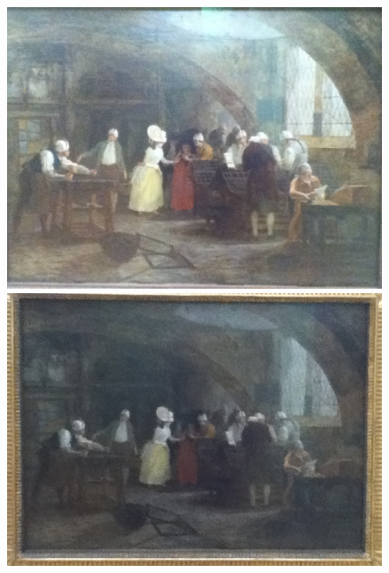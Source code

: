 \begin{figure}
  \centering
  \begin{minipage}[c]{.33\linewidth}
    \centering
    \includegraphics[width=\textwidth]{figures/11J-0521.JPG}
  \end{minipage} \hfill
  \begin{minipage}[c]{.33\linewidth}
    \centering
    \includegraphics[width=\textwidth]{figures/11J-1.JPG}
  \end{minipage}
  \begin{minipage}[c]{.32\linewidth}
    \centering

\end{minipage}
\end{figure}
